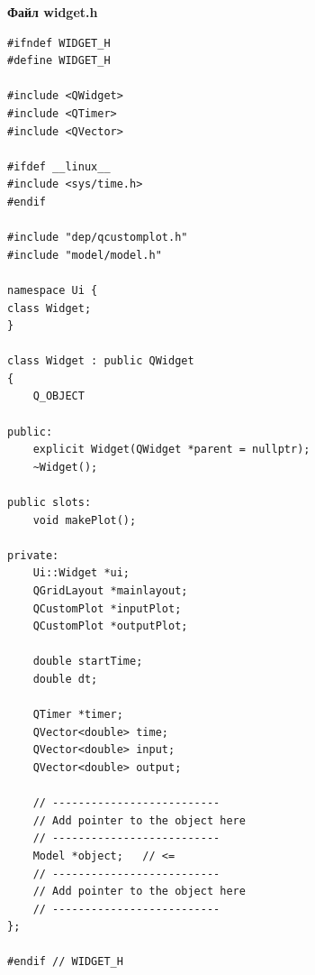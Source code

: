 \documentclass[14pt,a4paper]{extreport}
\begin{document}
\textbf{Файл widget.h}
\begin{alltt}
\begin{verbatim}
#ifndef WIDGET_H
#define WIDGET_H

#include <QWidget>
#include <QTimer>
#include <QVector>

#ifdef __linux__
#include <sys/time.h>
#endif

#include "dep/qcustomplot.h"
#include "model/model.h"

namespace Ui {
class Widget;
}

class Widget : public QWidget
{
    Q_OBJECT

public:
    explicit Widget(QWidget *parent = nullptr);
    ~Widget();

public slots:
    void makePlot();

private:
    Ui::Widget *ui;
    QGridLayout *mainlayout;
    QCustomPlot *inputPlot;
    QCustomPlot *outputPlot;

    double startTime;
    double dt;

    QTimer *timer;
    QVector<double> time;
    QVector<double> input;
    QVector<double> output;

    // --------------------------
    // Add pointer to the object here
    // --------------------------
    Model *object;   // <=
    // --------------------------
    // Add pointer to the object here
    // --------------------------
};

#endif // WIDGET_H
\end{verbatim}
\end{alltt}
\end{document}
